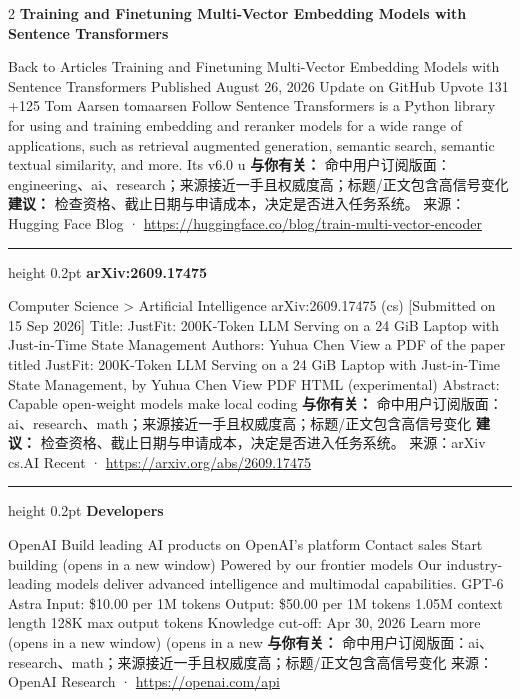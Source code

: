 \documentclass[10.5pt]{ctexart}
\begin{document}
\begin{multicols}{2}
{\large\bfseries Training and Finetuning Multi-Vector Embedding Models with Sentence Transformers}\par
Back to Articles Training and Finetuning Multi-Vector Embedding Models with Sentence Transformers Published August 26, 2026 Update on GitHub Upvote 131 +125 Tom Aarsen tomaarsen Follow Sentence Transformers is a Python library for using and training embedding and reranker models for a wide range of applications, such as retrieval augmented generation, semantic search, semantic textual similarity, and more. Its v6.0 u
\textbf{与你有关：} 命中用户订阅版面：engineering、ai、research；来源接近一手且权威度高；标题/正文包含高信号变化
\textbf{建议：} 检查资格、截止日期与申请成本，决定是否进入任务系统。
{\footnotesize\color{ormuted} 来源：Hugging Face Blog · \url{https://huggingface.co/blog/train-multi-vector-encoder}}
\vspace{2mm}
\hrule height 0.2pt
\vspace{2mm}
{\large\bfseries arXiv:2609.17475}\par
Computer Science > Artificial Intelligence arXiv:2609.17475 (cs) [Submitted on 15 Sep 2026] Title: JustFit: 200K-Token LLM Serving on a 24 GiB Laptop with Just-in-Time State Management Authors: Yuhua Chen View a PDF of the paper titled JustFit: 200K-Token LLM Serving on a 24 GiB Laptop with Just-in-Time State Management, by Yuhua Chen View PDF HTML (experimental) Abstract: Capable open-weight models make local coding
\textbf{与你有关：} 命中用户订阅版面：ai、research、math；来源接近一手且权威度高；标题/正文包含高信号变化
\textbf{建议：} 检查资格、截止日期与申请成本，决定是否进入任务系统。
{\footnotesize\color{ormuted} 来源：arXiv cs.AI Recent · \url{https://arxiv.org/abs/2609.17475}}
\vspace{2mm}
\hrule height 0.2pt
\vspace{2mm}
{\large\bfseries Developers}\par
OpenAI Build leading AI products on OpenAI’s platform Contact sales Start building (opens in a new window) Powered by our frontier models Our industry-leading models deliver advanced intelligence and multimodal capabilities. GPT-6 Astra Input: \$10.00 per 1M tokens Output: \$50.00 per 1M tokens 1.05M context length 128K max output tokens Knowledge cut-off: Apr 30, 2026 Learn more (opens in a new window) (opens in a new
\textbf{与你有关：} 命中用户订阅版面：ai、research、math；来源接近一手且权威度高；标题/正文包含高信号变化
{\footnotesize\color{ormuted} 来源：OpenAI Research · \url{https://openai.com/api}}

\end{multicols}
\end{document}
